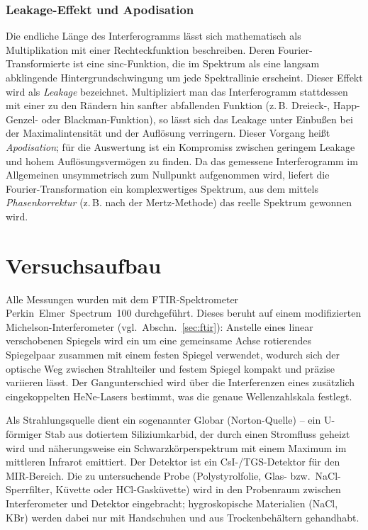 \documentclass[11pt,a4paper]{article}
\begin{document}
\subsubsection{Leakage-Effekt und Apodisation}

Die endliche Länge des Interferogramms lässt sich mathematisch als Multiplikation
mit einer Rechteckfunktion beschreiben. Deren Fourier-Transformierte ist eine
$\mathrm{sinc}$-Funktion, die im Spektrum als eine langsam abklingende
Hintergrundschwingung um jede Spektrallinie erscheint. Dieser Effekt wird als
\emph{Leakage} bezeichnet. Multipliziert man das Interferogramm stattdessen mit
einer zu den Rändern hin sanfter abfallenden Funktion (z.\,B.
Dreieck-, Happ-Genzel- oder Blackman-Funktion), so lässt sich das Leakage unter
Einbußen bei der Maximalintensität und der Auflösung verringern. Dieser Vorgang
heißt \emph{Apodisation}; für die Auswertung ist ein Kompromiss zwischen
geringem Leakage und hohem Auflösungsvermögen zu finden. Da das gemessene
Interferogramm im Allgemeinen unsymmetrisch zum Nullpunkt aufgenommen wird,
liefert die Fourier-Transformation ein komplexwertiges Spektrum, aus dem mittels
\emph{Phasenkorrektur} (z.\,B. nach der Mertz-Methode) das reelle Spektrum
gewonnen wird.



\section{Versuchsaufbau}
\label{sec:aufbau}

Alle Messungen wurden mit dem FTIR-Spektrometer Perkin~Elmer~Spectrum~100
durchgeführt. Dieses beruht auf einem modifizierten Michelson-Interferometer
(vgl.\ Abschn.~\ref{sec:ftir}): Anstelle eines linear verschobenen Spiegels wird
ein um eine gemeinsame Achse rotierendes Spiegelpaar zusammen mit einem festen
Spiegel verwendet, wodurch sich der optische Weg zwischen Strahlteiler und festem
Spiegel kompakt und präzise variieren lässt. Der Gangunterschied wird über die
Interferenzen eines zusätzlich eingekoppelten HeNe-Lasers bestimmt, was die
genaue Wellenzahlskala festlegt.

Als Strahlungsquelle dient ein sogenannter Globar (Norton-Quelle) -- ein
U-förmiger Stab aus dotiertem Siliziumkarbid, der durch einen Stromfluss geheizt
wird und näherungsweise ein Schwarzkörperspektrum mit einem Maximum im mittleren
Infrarot emittiert. Der Detektor ist ein CsI-/TGS-Detektor für den MIR-Bereich.
Die zu untersuchende Probe (Polystyrolfolie, Glas- bzw.\ NaCl-Sperrfilter,
Küvette oder HCl-Gasküvette) wird in den Probenraum zwischen Interferometer und
Detektor eingebracht; hygroskopische Materialien (NaCl, KBr) werden dabei nur mit
Handschuhen und aus Trockenbehältern gehandhabt.
\end{document}
